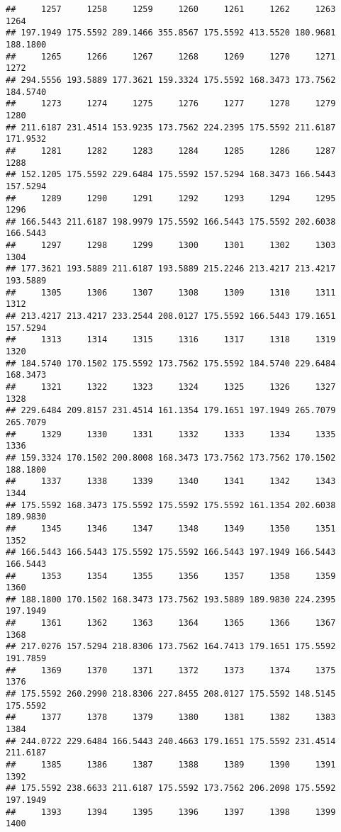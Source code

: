 \documentclass[
]{article}
\begin{document}
\begin{verbatim}
##     1257     1258     1259     1260     1261     1262     1263     1264 
## 197.1949 175.5592 289.1466 355.8567 175.5592 413.5520 180.9681 188.1800 
##     1265     1266     1267     1268     1269     1270     1271     1272 
## 294.5556 193.5889 177.3621 159.3324 175.5592 168.3473 173.7562 184.5740 
##     1273     1274     1275     1276     1277     1278     1279     1280 
## 211.6187 231.4514 153.9235 173.7562 224.2395 175.5592 211.6187 171.9532 
##     1281     1282     1283     1284     1285     1286     1287     1288 
## 152.1205 175.5592 229.6484 175.5592 157.5294 168.3473 166.5443 157.5294 
##     1289     1290     1291     1292     1293     1294     1295     1296 
## 166.5443 211.6187 198.9979 175.5592 166.5443 175.5592 202.6038 166.5443 
##     1297     1298     1299     1300     1301     1302     1303     1304 
## 177.3621 193.5889 211.6187 193.5889 215.2246 213.4217 213.4217 193.5889 
##     1305     1306     1307     1308     1309     1310     1311     1312 
## 213.4217 213.4217 233.2544 208.0127 175.5592 166.5443 179.1651 157.5294 
##     1313     1314     1315     1316     1317     1318     1319     1320 
## 184.5740 170.1502 175.5592 173.7562 175.5592 184.5740 229.6484 168.3473 
##     1321     1322     1323     1324     1325     1326     1327     1328 
## 229.6484 209.8157 231.4514 161.1354 179.1651 197.1949 265.7079 265.7079 
##     1329     1330     1331     1332     1333     1334     1335     1336 
## 159.3324 170.1502 200.8008 168.3473 173.7562 173.7562 170.1502 188.1800 
##     1337     1338     1339     1340     1341     1342     1343     1344 
## 175.5592 168.3473 175.5592 175.5592 175.5592 161.1354 202.6038 189.9830 
##     1345     1346     1347     1348     1349     1350     1351     1352 
## 166.5443 166.5443 175.5592 175.5592 166.5443 197.1949 166.5443 166.5443 
##     1353     1354     1355     1356     1357     1358     1359     1360 
## 188.1800 170.1502 168.3473 173.7562 193.5889 189.9830 224.2395 197.1949 
##     1361     1362     1363     1364     1365     1366     1367     1368 
## 217.0276 157.5294 218.8306 173.7562 164.7413 179.1651 175.5592 191.7859 
##     1369     1370     1371     1372     1373     1374     1375     1376 
## 175.5592 260.2990 218.8306 227.8455 208.0127 175.5592 148.5145 175.5592 
##     1377     1378     1379     1380     1381     1382     1383     1384 
## 244.0722 229.6484 166.5443 240.4663 179.1651 175.5592 231.4514 211.6187 
##     1385     1386     1387     1388     1389     1390     1391     1392 
## 175.5592 238.6633 211.6187 175.5592 173.7562 206.2098 175.5592 197.1949 
##     1393     1394     1395     1396     1397     1398     1399     1400 

\end{verbatim}
\end{document}
